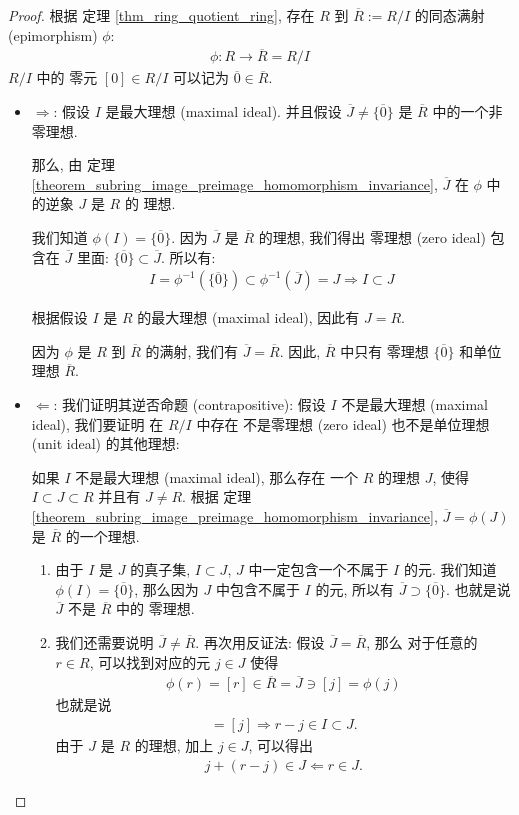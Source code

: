 \documentclass[utf8]{ctexbook}
\theoremstyle{definition}
\begin{document}
\begin{proof}
根据 定理 \ref{thm_ring_quotient_ring}, 存在 $R$ 到 $\overline{R} := R/I$ 的同态满射 (epimorphism) $\phi$:
\begin{align*}
\phi: R \longrightarrow \overline{R} = R/I
\end{align*}
$R/I$ 中的 零元 $[0] \in R/I $ 可以记为 $\overline{0} \in \overline{R} $.

\begin{itemize}
\item{$\Longrightarrow$: 假设 $I$ 是最大理想 (maximal ideal). 并且假设 $\overline{J} \neq \{ \overline{0} \}$ 是 $\overline{R}$ 中的一个非零理想. 

那么, 由 定理 \ref{theorem_subring_image_preimage_homomorphism_invariance}, $\overline{J}$ 在 $\phi$ 中的逆象 $J$ 是 $R$ 的 理想. 

我们知道 $\phi(I) = \{ \overline{0} \} $. 因为 $\overline{J}$ 是 $\overline{R}$ 的理想, 我们得出 零理想 (zero ideal) 包含在 $\overline{J}$ 里面: $ \{ \overline{0} \} \subset \overline{J} $. 所以有:
\begin{align*}
I = \phi^{-1} (\{ \overline{0} \}) \subset \phi^{-1} (\overline{J}) = J \Longrightarrow I \subset J
\end{align*}

根据假设 $I$ 是 $R$ 的最大理想 (maximal ideal), 因此有 $J = R$.

因为 $\phi$ 是 $R$ 到 $\overline{R} $ 的满射, 我们有 $\overline{J} = \overline{R} $. 因此, $\overline{R} $ 中只有 零理想 $\{ \overline{0} \}$ 和单位理想 $\overline{R}$.
}
\item{$\Longleftarrow$: 我们证明其逆否命题 (contrapositive): 假设 $I$ 不是最大理想 (maximal ideal), 我们要证明 在 $R/I$ 中存在 不是零理想 (zero ideal) 也不是单位理想 (unit ideal) 的其他理想:

如果 $I$ 不是最大理想 (maximal ideal), 那么存在 一个 $R$ 的理想 $J$, 使得 $I \subset J \subset R$ 并且有 $J \neq R$. 根据 定理 \ref{theorem_subring_image_preimage_homomorphism_invariance}, $\overline{J} = \phi(J) $ 是 $\overline{R} $ 的一个理想.

\begin{enumerate}
\item{由于 $I$ 是 $J$ 的真子集, $I \subset J$, $J$ 中一定包含一个不属于 $I$ 的元. 我们知道 $\phi(I) = \{ \overline{0} \}$, 那么因为 $J$ 中包含不属于 $I$ 的元, 所以有 $\overline{J} \supset \{ \overline{0 }\}$. 也就是说 $\overline{J}$ 不是 $\overline{R} $ 中的 零理想.}
\item{我们还需要说明 $\overline{J} \neq \overline{R} $. 再次用反证法: 假设 $\overline{J} = \overline{R} $, 那么 对于任意的 $r \in R$, 可以找到对应的元 $j \in J$ 使得 
\begin{align*}
\phi(r) = [r] \in \overline{R} =  \overline{J} \ni [j] = \phi(j)
\end{align*}
也就是说
\begin{align*}
[r] = [j] \Longrightarrow r - j \in I \subset J .
\end{align*}
由于 $J$ 是 $R$ 的理想, 加上 $j \in J$, 可以得出
\begin{align*}
j + (r - j) \in J \Longleftarrow r \in J.
\end{align*}

}
\end{enumerate}}
\end{itemize}
\end{proof}
\end{document}
